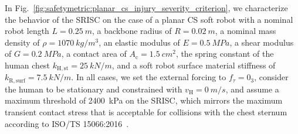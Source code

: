 In Fig.~\ref{fig:safetymetric:planar_cs_injury_severity_criterion}, we characterize the behavior of the \gls{SRISC} on the case of a planar \gls{CS} soft robot with a nominal robot length $L = \SI{0.25}{m}$, a backbone radius of $R = \SI{0.02}{m}$, a nominal mass density of $\rho = \SI{1070}{kg \per m^3}$, an elastic modulus of $E = \SI{0.5}{MPa}$, a shear modulus of $G = \SI{0.2}{MPa}$, a contact area of $A_\mathrm{c} = \SI{1.5}{cm^2}$, the spring constant of the human chest $k_\mathrm{H,st} = \SI{25}{kN \per m}$, and a soft robot surface material stiffness of $k_{\mathrm{R,surf}} = \SI{7.5}{kN \per m}$.
In all cases, we set the external forcing to $f_\tau = 0_3$, consider the human to be stationary and constrained with $v_\mathrm{H} = \SI{0}{m \per s}$, and assume a maximum threshold of \SI{2400}{kPa} on the \gls{SRISC}, which mirrors the maximum transient contact stress that is acceptable for collisions with the chest sternum according to ISO/TS 15066:2016~\citep{iso2016collaborative}.
